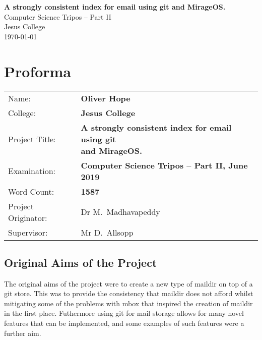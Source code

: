 \documentclass[12pt,a4paper,twoside,openright]{report}
\begin{document}





\pagestyle{empty}


\vspace*{60mm}
\begin{center}
\Huge
\textbf{A strongly consistent index for email using git and MirageOS.} \\[5mm]
Computer Science Tripos -- Part II \\[5mm]
Jesus College \\[5mm]
\today  %
\end{center}


\pagestyle{plain}

\chapter*{Proforma}

{\large
\begin{tabular}{ll}
Name:               & \bf Oliver Hope \\
College:            & \bf Jesus College \\
Project Title:      & \makecell[l]{\bf A strongly consistent index for email using git \\ \bf and MirageOS.} \\
Examination:        & \bf Computer Science Tripos -- Part II, June 2019 \\
Word Count:         & \bf 1587\footnotemark[1] \\
Project Originator: & Dr M.~Madhavapeddy \\
Supervisor:         & Mr D.~Allsopp \\
\end{tabular}
}


\section*{Original Aims of the Project}

The original aims of the project were to create a new type of maildir\cite{maildir-man} on top of a git store. This was to provide the consistency that maildir does not afford whilst mitigating some of the problems with mbox that inspired the creation of maildir in the first place. Futhermore using git for mail storage allows for many novel features that can be implemented, and some examples of such features were a further aim.
\end{document}
